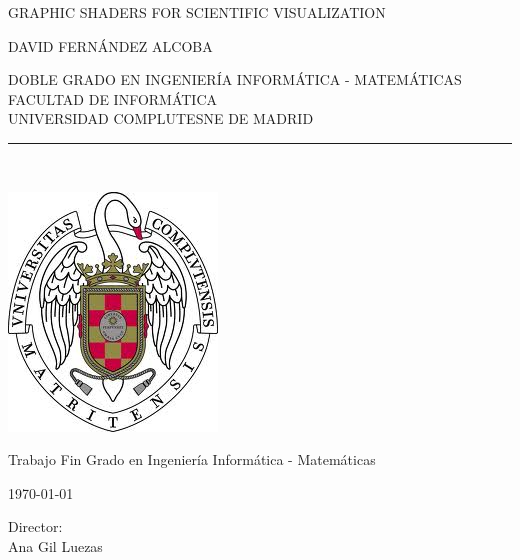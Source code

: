 
\newpage


\thispagestyle{empty}

\begin{center}

   \vspace{1cm}

   {\Large GRAPHIC SHADERS FOR SCIENTIFIC VISUALIZATION}\\

   \vspace{0.5cm}

   \vspace{0.5cm}

   {\large DAVID FERNÁNDEZ ALCOBA}\\

   \vspace{0.5cm}

   DOBLE GRADO EN INGENIERÍA INFORMÁTICA - MATEMÁTICAS\\ 
   FACULTAD DE INFORMÁTICA\\
   UNIVERSIDAD COMPLUTESNE DE MADRID \\

   \vspace{0.65cm}
   \rule{2in}{0.5pt}\\
   \vspace{1.85cm}

  \includegraphics[height=2.5in]{figures/escudo.jpg}
  
   \vspace{1.5cm}
Trabajo Fin Grado en Ingeniería Informática - Matemáticas

   \vspace{0.5cm}

  \today\\
   \vspace{1cm}

\end{center}

{\raggedleft
   \vspace{ 1cm}
Director:\\
   \vspace{ 0.2cm}
Ana Gil Luezas\\
}
